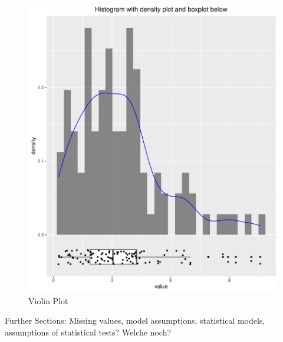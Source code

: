 \documentclass[12pt,a4paper]{article}
\begin{document}
\begin{figure}[htbp]
\begin{minipage}[b]{0.45\textwidth}
    \includegraphics[width=\textwidth]{./images/density_plot_with_boxplot.pdf}
    \caption{Violin Plot}
    \label{densityplot}
  \end{minipage}
\end{figure}

Further Sections: Missing values, model assumptions, statistical models, assumptions of statistical tests?
Welche noch?

\newpage


%
%

\end{document}
